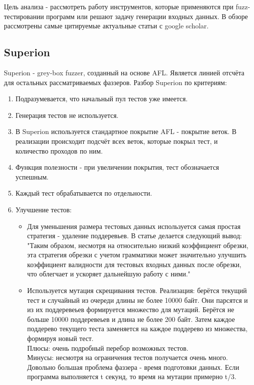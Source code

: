 \documentclass[a4paper]{article}
\begin{document}
Цель анализа - рассмотреть работу инструментов, которые применяются при fuzz-тестировании программ или решают задачу генерации входных данных. В обзоре рассмотрены самые цитируемые актуальные статьи с google scholar.

\subsection{Superion}
\indent

Superion\cite{litlink3} - grey-box fuzzer, созданный на основе AFL. Является линией отсчёта для остальных рассматриваемых фаззеров. Разбор Superion по критериям: 
\begin{enumerate}
    \item Подразумевается, что начальный пул тестов уже имеется.
    \item Генерация тестов не используется.
    \item В Superion используется стандартное покрытие AFL - покрытие веток. В реализации происходит подсчёт всех веток, которые покрыл тест, и количество проходов по ним.
    \item Функция полезности - при увеличении покрытия, тест обозначается успешным.
    \item Каждый тест обрабатывается по отдельности.
    \item Улучшение тестов:
    \begin{itemize}
        \item Для уменьшения размера тестовых данных используется самая простая стратегия - удаление поддеревьев. В статье делается следующий вывод: "Таким образом, несмотря на относительно низкий коэффициент обрезки, эта стратегия обрезки с учетом грамматики может значительно улучшить коэффициент валидности для тестовых входных данных после обрезки, что облегчает и ускоряет дальнейшую работу с ними."
        \item Используется мутация скрещивания тестов. Реализация: берётся текущий тест и случайный из очереди длины не более 10000 байт. Они парсятся и из их поддеревеьев формируется множество для мутаций. Берётся не больше 10000 поддеревеьев и длина не более 200 байт.
        Затем каждое поддерево текущего теста заменяется на каждое поддерево из множества, формируя новый тест.\\
        Плюсы: очень подробный перебор возможных тестов.\\
        Минусы: несмотря на ограничения тестов получается очень много. Довольно большая проблема фаззера - время подготовки данных. Если программа выполняется t секунд, то время на мутации примерно t/3.

\end{itemize}
\end{enumerate}
\end{document}
